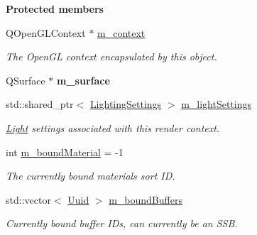 \begin{Indent}\textbf{ Protected members}\par
\begin{DoxyCompactItemize}
\item 
\mbox{\label{classrev_1_1_render_context_a6547fd79c1d2829377aa5d87afb0e14d}} 
Q\+Open\+G\+L\+Context $\ast$ \mbox{\hyperlink{classrev_1_1_render_context_a6547fd79c1d2829377aa5d87afb0e14d}{m\+\_\+context}}
\begin{DoxyCompactList}\small\item\em The Open\+GL context encapsulated by this object. \end{DoxyCompactList}\item 
\mbox{\label{classrev_1_1_render_context_aeafa61565fc85198b2f66711b7c1f669}} 
Q\+Surface $\ast$ {\bfseries m\+\_\+surface}
\item 
\mbox{\label{classrev_1_1_render_context_a77267323952ee2aecf4787a9276b463f}} 
std\+::shared\+\_\+ptr$<$ \mbox{\hyperlink{classrev_1_1_lighting_settings}{Lighting\+Settings}} $>$ \mbox{\hyperlink{classrev_1_1_render_context_a77267323952ee2aecf4787a9276b463f}{m\+\_\+light\+Settings}}
\begin{DoxyCompactList}\small\item\em \mbox{\hyperlink{classrev_1_1_light}{Light}} settings associated with this render context. \end{DoxyCompactList}\item 
\mbox{\label{classrev_1_1_render_context_a3ce20fedf38832a647a26ff7e2e8f140}} 
int \mbox{\hyperlink{classrev_1_1_render_context_a3ce20fedf38832a647a26ff7e2e8f140}{m\+\_\+bound\+Material}} = -\/1
\begin{DoxyCompactList}\small\item\em The currently bound material\textquotesingle{}s sort ID. \end{DoxyCompactList}\item 
std\+::vector$<$ \mbox{\hyperlink{classrev_1_1_uuid}{Uuid}} $>$ \mbox{\hyperlink{classrev_1_1_render_context_aff265253ee2e10e55fabb1124945ff0d}{m\+\_\+bound\+Buffers}}
\begin{DoxyCompactList}\small\item\em Currently bound buffer I\+Ds, can currently be an S\+SB. \end{DoxyCompactList}\item 

\end{DoxyCompactItemize}
\end{Indent}
